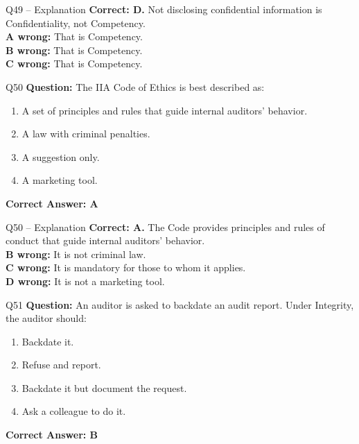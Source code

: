 \documentclass[aspectratio=169,10pt]{beamer}
\begin{document}
	\begin{frame}[t]{Q49 -- Explanation}
		\small
		\textbf{Correct: D.} Not disclosing confidential information is Confidentiality, not Competency. \\[4pt]
		\textbf{A wrong:} That is Competency. \\[2pt]
		\textbf{B wrong:} That is Competency. \\[2pt]
		\textbf{C wrong:} That is Competency.
	\end{frame}
	
	\begin{frame}[t]{Q50}
		\small
		\textbf{Question:} The IIA Code of Ethics is best described as:
		\begin{enumerate}[label=\Alph*.,itemsep=1pt,topsep=2pt]
			\item A set of principles and rules that guide internal auditors' behavior.
			\item A law with criminal penalties.
			\item A suggestion only.
			\item A marketing tool.
		\end{enumerate}
		\vspace{4pt}
		\textbf{Correct Answer: A}
	\end{frame}
	
	\begin{frame}[t]{Q50 -- Explanation}
		\small
		\textbf{Correct: A.} The Code provides principles and rules of conduct that guide internal auditors' behavior. \\[4pt]
		\textbf{B wrong:} It is not criminal law. \\[2pt]
		\textbf{C wrong:} It is mandatory for those to whom it applies. \\[2pt]
		\textbf{D wrong:} It is not a marketing tool.
	\end{frame}
	
	\begin{frame}[t]{Q51}
		\small
		\textbf{Question:} An auditor is asked to backdate an audit report. Under Integrity, the auditor should:
		\begin{enumerate}[label=\Alph*.,itemsep=1pt,topsep=2pt]
			\item Backdate it.
			\item Refuse and report.
			\item Backdate it but document the request.
			\item Ask a colleague to do it.
		\end{enumerate}
		\vspace{4pt}
		\textbf{Correct Answer: B}
	\end{frame}
	
\end{document}
